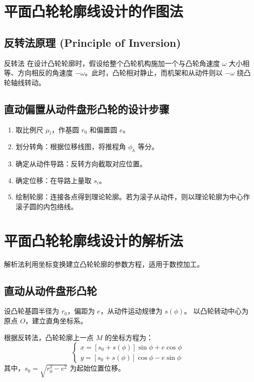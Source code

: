 \section{平面凸轮轮廓线设计的作图法}

\subsection{反转法原理 (Principle of Inversion)}
\begin{theorem}{反转法}
	在设计凸轮轮廓时，假设给整个凸轮机构施加一个与凸轮角速度 $\omega$ 大小相等、方向相反的角速度 $-\omega$。此时，凸轮相对静止，而机架和从动件则以 $-\omega$ 绕凸轮轴线转动。
\end{theorem}

\subsection{直动偏置从动件盘形凸轮的设计步骤}
\begin{enumerate}
	\item 取比例尺 $\mu_l$，作基圆 $r_0$ 和偏置圆 $e$。
	\item 划分转角：根据位移线图，将推程角 $\phi_h$ 等分。
	\item 确定从动件导路：反转方向截取对应位置。
	\item 确定位移：在导路上量取 $s_i$。
	\item 绘制轮廓：连接各点得到理论轮廓。若为滚子从动件，则以理论轮廓为中心作滚子圆的内包络线。
\end{enumerate}

\section{平面凸轮轮廓线设计的解析法}

解析法利用坐标变换建立凸轮轮廓的参数方程，适用于数控加工。

\subsection{直动从动件盘形凸轮}
设凸轮基圆半径为 $r_0$，偏距为 $e$，从动件运动规律为 $s(\phi)$。
以凸轮转动中心为原点 $O$，建立直角坐标系。

根据反转法，凸轮轮廓上一点 $M$ 的坐标方程为：
\begin{equation}
	\begin{cases}
		x = [s_0 + s(\phi)] \sin \phi + e \cos \phi \\
		y = [s_0 + s(\phi)] \cos \phi - e \sin \phi
	\end{cases}
\end{equation}
其中，$s_0 = \sqrt{r_0^2 - e^2}$ 为起始位置位移。

